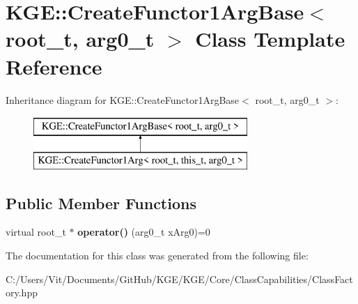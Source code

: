 \hypertarget{class_k_g_e_1_1_create_functor1_arg_base}{\section{K\-G\-E\-:\-:Create\-Functor1\-Arg\-Base$<$ root\-\_\-t, arg0\-\_\-t $>$ Class Template Reference}
\label{class_k_g_e_1_1_create_functor1_arg_base}
}
Inheritance diagram for K\-G\-E\-:\-:Create\-Functor1\-Arg\-Base$<$ root\-\_\-t, arg0\-\_\-t $>$\-:\begin{figure}[H]
\begin{center}
\leavevmode
\includegraphics[height=2.000000cm]{class_k_g_e_1_1_create_functor1_arg_base}
\end{center}
\end{figure}
\subsection*{Public Member Functions}
\begin{DoxyCompactItemize}
\item 
\hypertarget{class_k_g_e_1_1_create_functor1_arg_base_af10dd2de0f588c119d16997d0462539a}{virtual root\-\_\-t $\ast$ {\bfseries operator()} (arg0\-\_\-t x\-Arg0)=0}\label{class_k_g_e_1_1_create_functor1_arg_base_af10dd2de0f588c119d16997d0462539a}

\end{DoxyCompactItemize}


The documentation for this class was generated from the following file\-:\begin{DoxyCompactItemize}
\item 
C\-:/\-Users/\-Vit/\-Documents/\-Git\-Hub/\-K\-G\-E/\-K\-G\-E/\-Core/\-Class\-Capabilities/Class\-Factory.\-hpp\end{DoxyCompactItemize}

